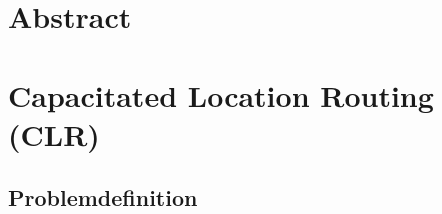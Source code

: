 \documentclass[a4paper,ngerman,11pt,bibtotoc]{scrartcl}
\theoremstyle{definition}
\theoremstyle{plain}
\theoremstyle{remark}
\begin{document}


\tableofcontents

\newpage
	
\section*{\glqq Abstract\grqq}



\section{Capacitated Location Routing (CLR)}

	\subsection{Problemdefinition}
\end{document}
